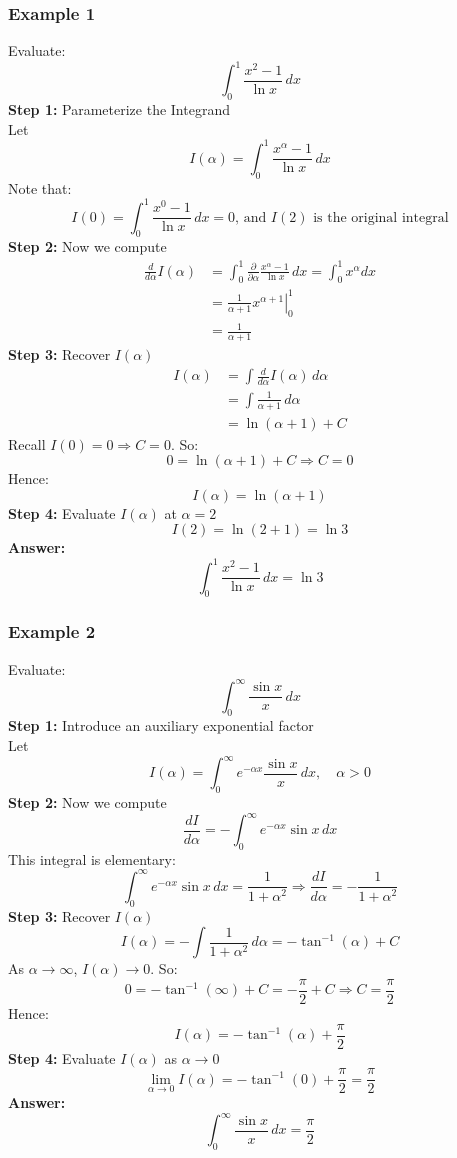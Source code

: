 \documentclass[11pt]{article}
\begin{document}
\subsubsection*{Example 1}
Evaluate:
\[
    \int_0^1 \frac{x^2-1}{\ln x}\,dx
\]
\textbf{Step 1: }Parameterize the Integrand\\
Let
\[
    I(\alpha)=\int_0^1 \frac{x^\alpha-1}{\ln x}\,dx
\]Note that:
\[
    I(0)=\int_0^1 \frac{x^0-1}{\ln x}\,dx=0\text{, and }I(2)\text{ is the original integral}
\]
\textbf{Step 2: }Now we compute
\[
    \begin{split}
        \frac{d}{d\alpha}I(\alpha)&=\int_0^1 \frac{\partial}{\partial\alpha}\frac{x^\alpha-1}{\ln x}\,dx=\int_0^1 x^\alpha dx\\
        &=\left.\frac{1}{\alpha +1}x^{\alpha +1}\right|_0^1\\
        &=\frac{1}{\alpha + 1} 
    \end{split}
\]
\textbf{Step 3: }Recover $I(\alpha)$
\[
    \begin{split}
        I(\alpha)&=\int \frac{d}{d\alpha}I(\alpha)\,d\alpha\\
        &=\int \frac{1}{\alpha + 1}\,d\alpha\\
        &=\ln(\alpha + 1)+C
    \end{split}
\]Recall $I(0)=0 \Rightarrow C=0$. So:
\[
    0=\ln(\alpha + 1)+C\Rightarrow C=0
\]
Hence:
\[
    I(\alpha)=\ln(\alpha + 1)
\]
\textbf{Step 4: }Evaluate $I(\alpha)$ at $\alpha = 2$
\[
    I(2)=\ln(2 + 1)=\ln3
\]
\textbf{Answer: }
\[
    \int_0^1 \frac{x^2-1}{\ln x}\,dx=\ln3
\]
\subsubsection*{Example 2}
Evaluate:
\[
    \int_0^{\infty} \frac{\sin x}{x}\,dx
\]
\textbf{Step 1: }Introduce an auxiliary exponential factor\\
Let
\[
    I(\alpha) = \int_0^{\infty} e^{-\alpha x} \frac{\sin x}{x} \, dx, \quad \alpha > 0
\]
\textbf{Step 2: }Now we compute
\[
    \frac{dI}{d\alpha} = -\int_0^{\infty} e^{-\alpha x} \sin x \, dx
\]
This integral is elementary:
\[
    \int_0^{\infty} e^{-\alpha x} \sin x \, dx = \frac{1}{1 + \alpha^2}
    \Rightarrow \frac{dI}{d\alpha} = -\frac{1}{1 + \alpha^2}
\]
\textbf{Step 3: }Recover $I(\alpha)$
\[
    I(\alpha) = -\int \frac{1}{1 + \alpha^2} \, d\alpha = -\tan^{-1}(\alpha) + C
\]
As $\alpha \to \infty$, $I(\alpha) \to 0$. So:
\[
    0 = -\tan^{-1}(\infty) + C = -\frac{\pi}{2} + C \Rightarrow C = \frac{\pi}{2}
\]
Hence:
\[
    I(\alpha) = - \tan^{-1}(\alpha)+\frac{\pi}{2}
\]
\textbf{Step 4: }Evaluate $I(\alpha)$ as $\alpha \to 0$
\[
    \lim_{\alpha \to 0} I(\alpha) = -\tan^{-1}(0)+\frac{\pi}{2} = \frac{\pi}{2}
\]
\textbf{Answer: }
\[
    \int_0^{\infty} \frac{\sin x}{x}\,dx=\frac{\pi}{2}
\]
\end{document}
